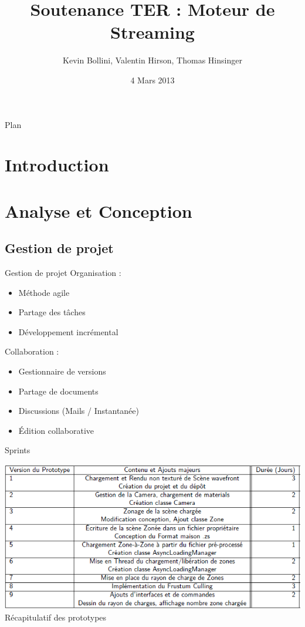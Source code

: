 \documentclass{beamer}
\title{Soutenance TER : Moteur de Streaming}
\author{Kevin Bollini, Valentin Hirson, Thomas Hinsinger}
\date{4 Mars 2013}
\begin{document}
	\begin{frame}
		\titlepage
	\end{frame}

	\begin{frame}{Plan}
		\tableofcontents
	\end{frame}

	\section{Introduction}
		
		
	\section{Analyse et Conception}
	\subsection{Gestion de projet}
		\begin{frame}{Gestion de projet}
		Organisation :
			\begin{itemize}
				\item{Méthode agile}
				\item{Partage des tâches}
				\item{Développement incrémental}
			\end{itemize} \pause
			Collaboration :
			\begin{itemize}
				\item{Gestionnaire de versions}
				\item{Partage de documents}
				\item{Discussions (Mails / Instantanée)}
				\item{Édition collaborative}
			\end{itemize}
		\end{frame}

		\begin{frame}{Sprints}
			\begin{center}
				\includegraphics[scale=0.5]{images/recapProto.png} \\
				Récapitulatif des prototypes\\
			\end{center}
		\end{frame}
\end{document}
